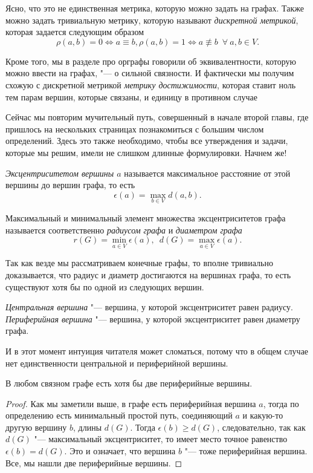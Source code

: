 	Ясно, что это не единственная метрика, которую можно задать на графах. Также можно задать тривиальную метрику, которую называют \emph{дискретной метрикой}, которая задается следующим образом
	$$\rho (a, b) = 0 \Leftrightarrow a \equiv b, \rho (a, b) = 1 \Leftrightarrow a \not\equiv b \;\ \forall \!\ a, b \in V.$$

	Кроме того, мы в разделе про орграфы говорили об эквивалентности, которую можно ввести на графах, "--- о сильной связности. И фактически мы получим схожую с дискретной метрикой \emph{метрику достижимости}, которая ставит ноль тем парам вершин, которые связаны, и единицу в противном случае


	Сейчас мы повторим мучительный путь, совершенный в начале второй главы, где пришлось на нескольких страницах познакомиться с большим числом определений. Здесь это также необходимо, чтобы все утверждения и задачи, которые мы решим, имели не слишком длинные формулировки. Начнем же!

\begin{definition}
	\emph{Эксцентриситетом вершины $a$} называется максимальное расстояние от этой вершины до вершин графа, то есть
	$$\epsilon(a) = \max\limits_{b \in V} d(a, b).$$
\end{definition}

\begin{definition}
	Максимальный и минимальный элемент множества эксцентриситетов графа называется соответственно \emph{радиусом графа} и \emph{диаметром графа}
	$$r(G) = \min\limits_{a \in V} \epsilon(a), \;\ d(G) = \max\limits_{a \in V} \epsilon(a).$$
\end{definition}

	Так как везде мы рассматриваем конечные графы, то вполне тривиально доказывается, что радиус и диаметр достигаются на вершинах графа, то есть существуют хотя бы по одной из следующих вершин.
	
\begin{definition}
	\emph{Центральная вершина} "--- вершина, у которой эксцентриситет равен радиусу. \emph{Периферийная вершина} "--- вершина, у которой эксцентриситет равен диаметру графа.
\end{definition}
	
	И в этот момент интуиция читателя может сломаться, потому что в общем случае нет единственности центральной и периферийной вершины.
	
\begin{statement}
	В любом связном графе есть хотя бы две периферийные вершины.
	
\begin{proof}
	Как мы заметили выше, в графе есть периферийная вершина $a$, тогда по определению есть минимальный простой путь, соединяющий $a$ и какую-то другую вершину $b$, длины $d(G)$. Тогда $\epsilon(b) \geqslant d(G)$, следовательно, так как $d(G)$ "--- максимальный эксцентриситет, то имеет место точное равенство $\epsilon(b) = d(G)$. Это и означает, что вершина $b$ "--- тоже периферийная вершина. Все, мы нашли две периферийные вершины.
\end{proof}
\end{statement}	

